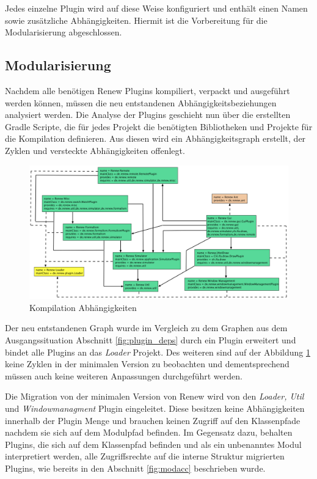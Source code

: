 	Jedes einzelne Plugin wird auf diese Weise konfiguriert und enthält einen Namen sowie zusätzliche Abhängigkeiten. Hiermit ist die Vorbereitung für die Modularisierung abgeschlossen. 


\subsection{Modularisierung}	
	Nachdem alle benötigen Renew Plugins kompiliert, verpackt und ausgeführt werden können, müssen die neu entstandenen Abhängigkeitsbeziehungen analysiert werden. Die Analyse der Plugins geschieht nun über die erstellten Gradle Scripte, die für jedes Projekt die benötigten Bibliotheken und Projekte für die Kompilation definieren. Aus diesen wird ein Abhängigkeitsgraph erstellt, der Zyklen und versteckte Abhängigkeiten offenlegt. 
	\bigbreak

	\begin{figure}[h!]
	  \centering
	  \includegraphics[width=\textwidth]{material/images/deps_tree.png}
	  \caption{Kompilation Abhängigkeiten}
	  \label{fig:deps}
	\end{figure}

	Der neu entstandenen Graph wurde im Vergleich zu dem Graphen aus dem Ausgangssituation Abschnitt \ref{fig:plugin_deps} durch ein Plugin erweitert und bindet alle Plugins an das \textit{Loader} Projekt. Des weiteren sind auf der Abbildung \ref{fig:deps} keine Zyklen in der minimalen Version zu beobachten und dementsprechend müssen auch keine weiteren Anpassungen durchgeführt werden. 
	\bigbreak

	Die Migration von der minimalen Version von Renew wird von den \textit{Loader, Util} und \textit{Windowmanagment} Plugin eingeleitet. Diese besitzen keine Abhängigkeiten innerhalb der Plugin Menge und brauchen keinen Zugriff auf den Klassenpfade nachdem sie sich auf dem Modulpfad befinden. Im Gegensatz dazu, behalten Plugins, die sich auf dem Klassenpfad befinden und als ein unbenanntes Modul interpretiert werden, alle Zugriffsrechte auf die interne Struktur migrierten Plugins, wie bereits in den Abschnitt \ref{fig:modacc} beschrieben wurde.
	\bigbreak

